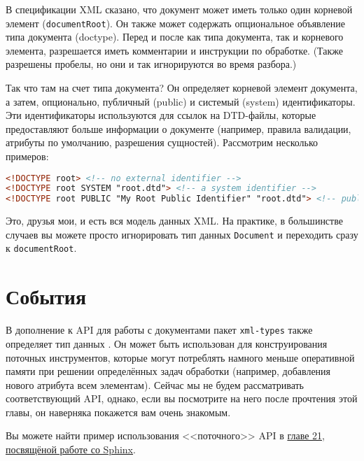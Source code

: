 В спецификации XML сказано, что документ может иметь только один корневой элемент (\lstinline!documentRoot!). Он также может содержать опциональное объявление типа документа (doctype). Перед и после как типа документа, так и корневого элемента, разрешается иметь комментарии и инструкции по обработке. (Также разрешены пробелы, но они и так игнорируются во время разбора.)

Так что там на счет типа документа? Он определяет корневой элемент документа, а затем, опционально, публичный (public) и системый (system) идентификаторы. Эти идентификаторы используются для ссылок на DTD-файлы, которые предоставляют больше информации о документе (например, правила валидации, атрибуты по умолчанию, разрешения сущностей). Рассмотрим несколько примеров:

\begin{lstlisting}[language=HTML]
<!DOCTYPE root> <!-- no external identifier -->
<!DOCTYPE root SYSTEM "root.dtd"> <!-- a system identifier -->
<!DOCTYPE root PUBLIC "My Root Public Identifier" "root.dtd"> <!-- public identifiers have a system ID as well -->
\end{lstlisting}

Это, друзья мои, и есть вся модель данных XML. На практике, в большинстве случаев вы можете просто игнорировать тип данных \lstinline!Document! и переходить сразу к \lstinline!documentRoot!.

\section{События} %

В дополнение к API для работы с документами пакет \lstinline!xml-types! также определяет тип данных . Он может быть использован для конструирования поточных инструментов, которые могут потреблять намного меньше оперативной памяти при решении определённых задач обработки (например, добавления нового атрибута всем элементам). Сейчас мы не будем рассматривать соответствующий API, однако, если вы посмотрите на него после прочтения этой главы, он наверняка покажется вам очень знакомым.

\begin{remark}
Вы можете найти пример использования <<поточного>> API в \hyperref[chap:sphinx]{главе 21, посвящёной работе со Sphinx}.
\end{remark}

